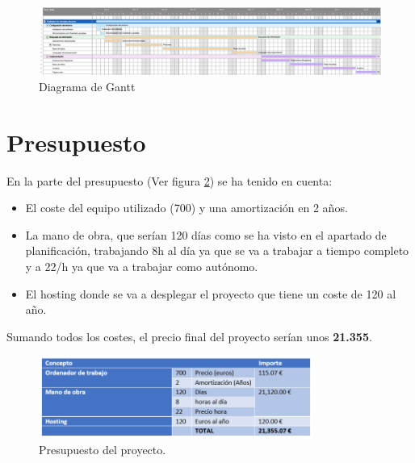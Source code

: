 \begin{figure}[htb]
    \centering
    \includegraphics[width=\textwidth]{imagenes/Diagrama_Gann.png}
\caption{Diagrama de Gantt}
\label{fig:Gantt}
\end{figure}

\section{Presupuesto}

En la parte del presupuesto (Ver figura \ref{fig:Presupuesto}) se ha tenido en cuenta:
\begin{itemize}
    \item El coste del equipo utilizado (700) y una amortización en 2 años.
    \item La mano de obra, que serían 120 días como se ha visto en el apartado de planificación, trabajando 8h al día ya que se va a trabajar a tiempo completo y a 22/h ya que va a trabajar como autónomo.
    \item El hosting donde se va a desplegar el proyecto que tiene un coste de 120 al año.
\end{itemize}

Sumando todos los costes, el precio final del proyecto serían unos \textbf{21.355}.

\begin{figure}[htb]
    \centering
    \includegraphics[width=0.8\textwidth]{imagenes/Presupuesto.png}
\caption{Presupuesto del proyecto.}
\label{fig:Presupuesto}
\end{figure}